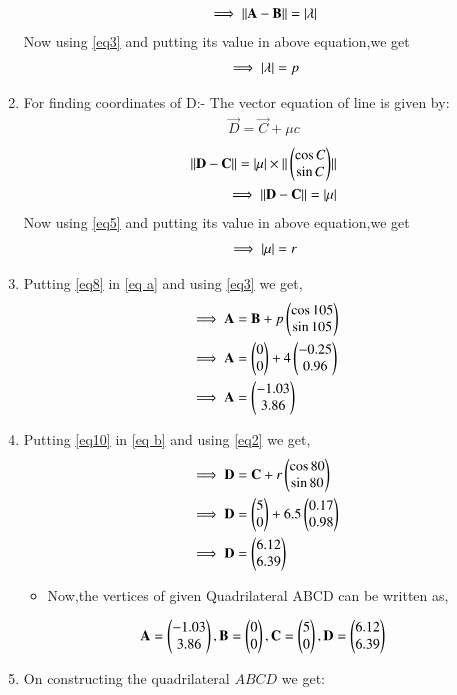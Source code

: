 \documentclass[journal,12pt,twocolumn]{IEEEtran}
\begin{document}
\begin{enumerate}
\begin{align}
\\
\implies \Vert\mathbf{A}-\mathbf{B}\rVert=\vert\lambda\vert
\end{align}
Now using \eqref{eq3} and putting its value in above equation,we get
\begin{align}
\implies \vert\lambda\vert=p \label{eq8}
\end{align}
\item For finding coordinates of D:-
The vector equation of line is given by:
\begin{align}
\vec{D}=\vec{C} + \mu c \label{eq9} 
\end{align}
\begin{align}
\Vert\mathbf{D}-\mathbf{C}\rVert = \vert\mu\vert\times\Vert\begin{pmatrix}\cos C\\\sin C\end{pmatrix}\rVert 
\\
\implies \Vert\mathbf{D}-\mathbf{C}\rVert=\vert\mu\vert
\end{align}
Now using \eqref{eq5} and putting its value in above equation,we get
\begin{align}
\implies \vert\mu\vert=r \label{eq10}
\end{align}
\item Putting \eqref{eq8} in \eqref{eq a} and using \eqref{eq3} we get,
\begin{align}
&\implies \mathbf{A}=\mathbf{B} +p\begin{pmatrix}\cos 105 \\\sin 105 \end{pmatrix}
\\
&\implies \mathbf{A}=\begin{pmatrix}0\\0\end{pmatrix} +4\begin{pmatrix}-0.25\\0.96\end{pmatrix} 
\\
&\implies \mathbf{A}=\begin{pmatrix}-1.03\\3.86\end{pmatrix}
\end{align}
\item Putting \eqref{eq10} in \eqref{eq b} and using \eqref{eq2} we get,
\begin{align}
&\implies \mathbf{D}=\mathbf{C} +r\begin{pmatrix}\cos 80 \\\sin 80 \end{pmatrix}
\\
&\implies \mathbf{D}=\begin{pmatrix}5\\0\end{pmatrix} +6.5\begin{pmatrix}0.17\\0.98\end{pmatrix} 
\\
&\implies \mathbf{D}=\begin{pmatrix}6.12\\6.39\end{pmatrix}
\end{align}
\begin{itemize}
\item Now,the vertices of given Quadrilateral ABCD can be written as,
\end{itemize}
\begin{align}
 \mathbf{A}=\begin{pmatrix}-1.03\\3.86\end{pmatrix},\mathbf{B} = \begin{pmatrix}0\\0\end{pmatrix}, \mathbf{C}=\begin{pmatrix}5\\0\end{pmatrix},\mathbf{D}=\begin{pmatrix}6.12\\6.39\end{pmatrix}
\end{align}
    \item On constructing the quadrilateral $ABCD$ we get:
\end{enumerate}   
\end{document}
